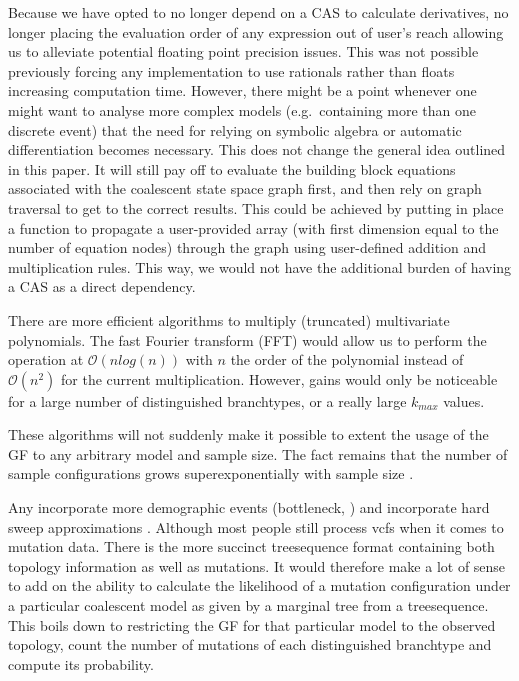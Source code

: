\documentclass[10pt, a4]{article}
\begin{document}
Because we have opted to no longer depend on a CAS to calculate derivatives, no longer placing the evaluation order of any expression out of user's reach allowing us to alleviate potential floating point precision issues. This was not possible previously forcing any implementation to use rationals rather than floats increasing computation time.
However, there might be a point whenever one might want to analyse more complex models (e.g.\ containing more than one discrete event) that the need for relying on symbolic algebra or automatic differentiation becomes necessary. This does not change the general idea outlined in this paper. It will still pay off to evaluate the building block equations associated with the coalescent state space graph first, and then rely on graph traversal to get to the correct results. This could be achieved by putting in place a function to propagate a user-provided array (with first dimension equal to the number of equation nodes) through the graph using user-defined addition and multiplication rules. This way, we would not have the additional burden of having a CAS as a direct dependency.

There are more efficient algorithms to multiply (truncated) multivariate polynomials. The fast Fourier transform (FFT) would allow us to perform the operation at $\mathcal{O}(n log(n))$ with $n$ the order of the polynomial instead of $\mathcal{O}(n^2)$ for the current multiplication. However, gains would only be noticeable for a large number of distinguished branchtypes, or a really large $k_{max}$ values. 
\newline

These algorithms will not suddenly make it possible to extent the usage of the GF to any arbitrary model and sample size. The fact remains that the number of sample configurations grows superexponentially with sample size \citep{Lohse2016}. %


Any
incorporate more demographic events (bottleneck, ) and incorporate hard sweep approximations \citep{Bisschop2021}.
Although most people still process vcfs when it comes to mutation data. There is the more succinct treesequence format containing both topology information as well as mutations. It would therefore make a lot of sense to add on the ability to calculate the likelihood of a mutation configuration under a particular coalescent model as given by a marginal tree from a treesequence. This boils down to restricting the GF for that particular model to the observed topology, count the number of mutations of each distinguished branchtype and compute its probability.
\end{document}
